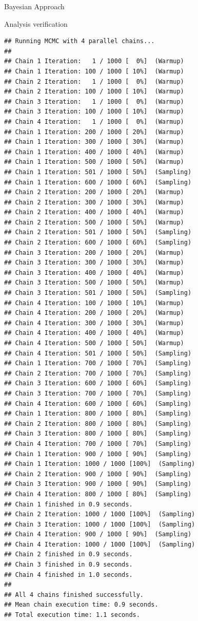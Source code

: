 \documentclass[
  ignorenonframetext,
]{beamer}
\begin{document}
\begin{frame}[fragile]{Bayesian Approach}
\begin{block}{Analysis verification}
\begin{verbatim}
## Running MCMC with 4 parallel chains...
## 
## Chain 1 Iteration:   1 / 1000 [  0%]  (Warmup) 
## Chain 1 Iteration: 100 / 1000 [ 10%]  (Warmup) 
## Chain 2 Iteration:   1 / 1000 [  0%]  (Warmup) 
## Chain 2 Iteration: 100 / 1000 [ 10%]  (Warmup) 
## Chain 3 Iteration:   1 / 1000 [  0%]  (Warmup) 
## Chain 3 Iteration: 100 / 1000 [ 10%]  (Warmup) 
## Chain 4 Iteration:   1 / 1000 [  0%]  (Warmup) 
## Chain 1 Iteration: 200 / 1000 [ 20%]  (Warmup) 
## Chain 1 Iteration: 300 / 1000 [ 30%]  (Warmup) 
## Chain 1 Iteration: 400 / 1000 [ 40%]  (Warmup) 
## Chain 1 Iteration: 500 / 1000 [ 50%]  (Warmup) 
## Chain 1 Iteration: 501 / 1000 [ 50%]  (Sampling) 
## Chain 1 Iteration: 600 / 1000 [ 60%]  (Sampling) 
## Chain 2 Iteration: 200 / 1000 [ 20%]  (Warmup) 
## Chain 2 Iteration: 300 / 1000 [ 30%]  (Warmup) 
## Chain 2 Iteration: 400 / 1000 [ 40%]  (Warmup) 
## Chain 2 Iteration: 500 / 1000 [ 50%]  (Warmup) 
## Chain 2 Iteration: 501 / 1000 [ 50%]  (Sampling) 
## Chain 2 Iteration: 600 / 1000 [ 60%]  (Sampling) 
## Chain 3 Iteration: 200 / 1000 [ 20%]  (Warmup) 
## Chain 3 Iteration: 300 / 1000 [ 30%]  (Warmup) 
## Chain 3 Iteration: 400 / 1000 [ 40%]  (Warmup) 
## Chain 3 Iteration: 500 / 1000 [ 50%]  (Warmup) 
## Chain 3 Iteration: 501 / 1000 [ 50%]  (Sampling) 
## Chain 4 Iteration: 100 / 1000 [ 10%]  (Warmup) 
## Chain 4 Iteration: 200 / 1000 [ 20%]  (Warmup) 
## Chain 4 Iteration: 300 / 1000 [ 30%]  (Warmup) 
## Chain 4 Iteration: 400 / 1000 [ 40%]  (Warmup) 
## Chain 4 Iteration: 500 / 1000 [ 50%]  (Warmup) 
## Chain 4 Iteration: 501 / 1000 [ 50%]  (Sampling) 
## Chain 1 Iteration: 700 / 1000 [ 70%]  (Sampling) 
## Chain 2 Iteration: 700 / 1000 [ 70%]  (Sampling) 
## Chain 3 Iteration: 600 / 1000 [ 60%]  (Sampling) 
## Chain 3 Iteration: 700 / 1000 [ 70%]  (Sampling) 
## Chain 4 Iteration: 600 / 1000 [ 60%]  (Sampling) 
## Chain 1 Iteration: 800 / 1000 [ 80%]  (Sampling) 
## Chain 2 Iteration: 800 / 1000 [ 80%]  (Sampling) 
## Chain 3 Iteration: 800 / 1000 [ 80%]  (Sampling) 
## Chain 4 Iteration: 700 / 1000 [ 70%]  (Sampling) 
## Chain 1 Iteration: 900 / 1000 [ 90%]  (Sampling) 
## Chain 1 Iteration: 1000 / 1000 [100%]  (Sampling) 
## Chain 2 Iteration: 900 / 1000 [ 90%]  (Sampling) 
## Chain 3 Iteration: 900 / 1000 [ 90%]  (Sampling) 
## Chain 4 Iteration: 800 / 1000 [ 80%]  (Sampling) 
## Chain 1 finished in 0.9 seconds.
## Chain 2 Iteration: 1000 / 1000 [100%]  (Sampling) 
## Chain 3 Iteration: 1000 / 1000 [100%]  (Sampling) 
## Chain 4 Iteration: 900 / 1000 [ 90%]  (Sampling) 
## Chain 4 Iteration: 1000 / 1000 [100%]  (Sampling) 
## Chain 2 finished in 0.9 seconds.
## Chain 3 finished in 0.9 seconds.
## Chain 4 finished in 1.0 seconds.
## 
## All 4 chains finished successfully.
## Mean chain execution time: 0.9 seconds.
## Total execution time: 1.1 seconds.
\end{verbatim}


\end{block}
\end{frame}
\end{document}
